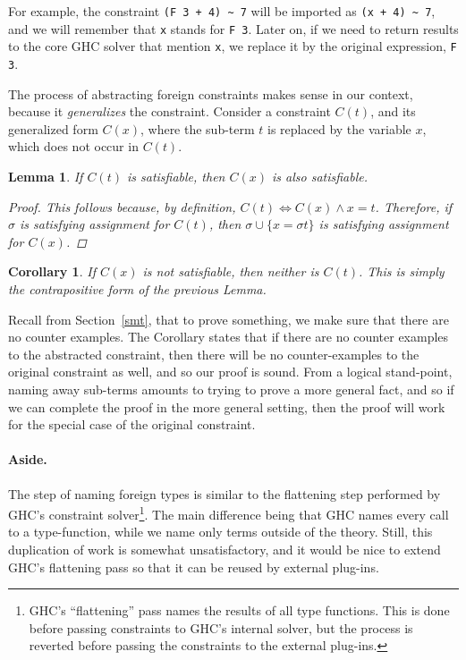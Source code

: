 \documentclass{sigplanconf}
\newtheorem*{lemma}{Lemma}
\newtheorem*{corollary}{Corollary}
\begin{document}
For example, the constraint \Verb"(F 3 + 4) ~ 7" will be imported as
\Verb"(x + 4) ~ 7", and we will remember that \Verb"x" stands for \Verb"F 3".
Later on, if we need to return results to the core GHC solver that mention
\Verb"x", we replace it by the original expression, \Verb"F 3".

The process of abstracting foreign constraints makes sense in our context,
because it {\em generalizes} the constraint.  Consider a constraint $C(t)$, and
its generalized form $C(x)$, where the sub-term $t$ is replaced by
the variable $x$, which does not occur in $C(t)$.

\begin{lemma}
If $C(t)$ is satisfiable, then $C(x)$ is also satisfiable.
\begin{proof} This follows because, by definition,
$C(t) \iff C(x) \wedge x = t$. Therefore, if $\sigma$ is satisfying
assignment for $C(t)$, then $\sigma \cup \{ x = \sigma t \}$ is satisfying
assignment for $C(x)$.
\end{proof}
\end{lemma}

\begin{corollary} If $C(x)$ is not satisfiable, then neither is $C(t)$.
This is simply the contrapositive form of the previous Lemma.
\end{corollary}

Recall from Section~\ref{smt}, that to prove something, we make sure
that there are no counter examples.  The Corollary states that if there
are no counter examples to the abstracted constraint, then there will
be no counter-examples to the original constraint as well, and so our
proof is sound.  From a logical stand-point, naming away sub-terms
amounts to trying to prove a more general fact, and so if we can complete
the proof in the more general setting, then the proof will work for
the special case of the original constraint.

\paragraph{Aside.}
The step of naming foreign types is similar to the flattening step performed
by GHC's constraint solver\footnote{GHC's ``flattening'' pass names the
results of all type functions.  This is done before passing constraints
to GHC's internal solver, but the process is reverted before passing the
constraints to the external plug-ins. }.
The main difference being that GHC names every
call to a type-function, while we name only terms outside of the theory.
Still, this duplication of work is somewhat unsatisfactory, and it would
be nice to extend GHC's flattening pass so that it can be reused by
external plug-ins.
\end{document}
